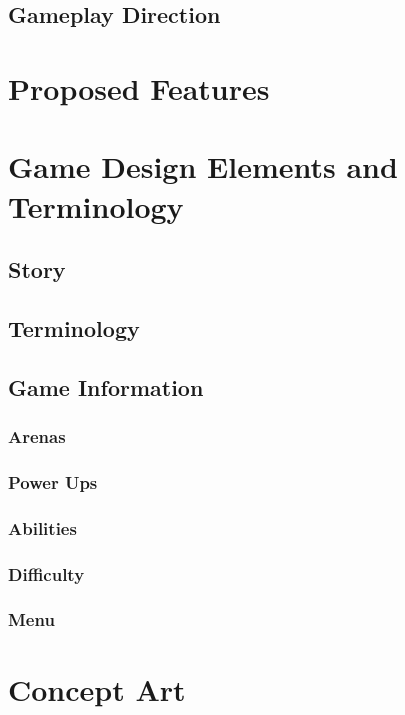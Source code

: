 \documentclass[12p]{article}
\theoremstyle{definition}
\begin{document}
\subsection{Gameplay Direction}
\section{Proposed Features}
\section{Game Design Elements and Terminology}
\subsection{Story}
\subsection{Terminology}
\subsection{Game Information}
\subsubsection{Arenas}
\subsubsection{Power Ups}
\subsubsection{Abilities}
\subsubsection{Difficulty}
\subsubsection{Menu}

\section{Concept Art}
\end{document}
